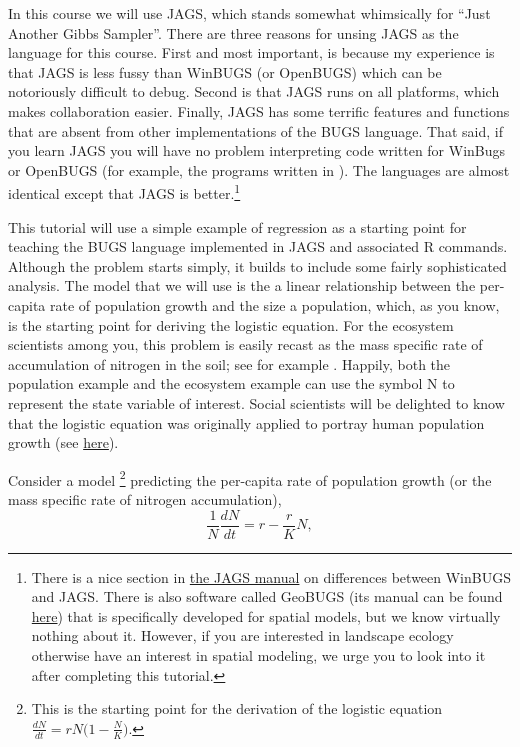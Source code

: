 \documentclass[12pt,english]{article}
\begin{document}
In this course we will use JAGS, which stands somewhat whimsically for \enquote{Just Another Gibbs Sampler}. There are three reasons for unsing JAGS as the language for this course. First and most important, is because my experience is that JAGS is less fussy than WinBUGS (or OpenBUGS) which can be notoriously difficult to debug. Second is that JAGS runs on all platforms, which makes collaboration easier. Finally, JAGS has some terrific features and functions that are absent from other implementations of the BUGS language. That said, if you learn JAGS you will have no problem interpreting code written for WinBugs or OpenBUGS (for example, the programs written in \citealt{McCarthy_Bayes_book}). The languages are almost identical except that JAGS is better.\footnote{There is a nice section in \href{https://sourceforge.net/projects/mcmc-jags/files/Manuals/4.x/}{the JAGS manual} on differences between WinBUGS and JAGS. There is also software called GeoBUGS (its manual can be found \href{http://www.mrc-bsu.cam.ac.uk/bugs/winbugs/contents.shtml}{here}) that is specifically developed for spatial models, but we know virtually nothing about it. However, if you are interested in landscape ecology otherwise have an interest in spatial modeling, we urge you to look into it after completing this tutorial.}

\newpage 

This tutorial will use a simple example of regression as a starting point for teaching the BUGS language implemented in JAGS and associated R commands. Although the problem starts simply, it builds to include some fairly sophisticated analysis. The model that we will use is the a linear relationship between the per-capita rate of population growth and the size a population, which, as you know, is the starting point for deriving the logistic equation. For the ecosystem scientists among you, this problem is easily recast as the mass specific rate of accumulation of nitrogen in the soil; see for example \citet{Knops_Tilman}. Happily, both the population example and the ecosystem example can use the symbol N to represent the state variable of interest. Social scientists will be delighted to know that the logistic equation was originally applied to portray human population growth (see \href{http://monkeysuncle.stanford.edu/?p=933}{here}). 

Consider a model \footnote{This is the starting point for the derivation of the logistic equation $\frac{dN}{dt}=rN\big(1-\frac{N}{K}\big)$.}
predicting the per-capita rate of population growth (or the mass specific rate of nitrogen accumulation),
\begin{equation}
\frac{1}{N}\frac{dN}{dt}=r-\frac{r}{K}N,
\end{equation}
\end{document}
